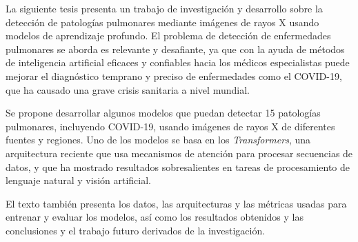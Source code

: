 

La siguiente tesis presenta un trabajo de investigación y desarrollo sobre la detección de patologías
pulmonares mediante imágenes de
rayos X usando modelos de aprendizaje profundo. El problema de detección de enfermedades pulmonares
se aborda es relevante y desafiante, ya que con la ayuda de métodos de inteligencia artificial
eficaces y confiables hacia los médicos especialistas puede mejorar el diagnóstico temprano y preciso
de enfermedades como el COVID-19, que ha causado una grave crisis sanitaria a nivel mundial.

Se propone desarrollar algunos modelos que puedan detectar 15 patologías pulmonares, incluyendo COVID-19,
usando imágenes de rayos X de diferentes fuentes y regiones. Uno de los modelos se basa en los
\textit{Transformers}, una arquitectura reciente que usa mecanismos de atención para procesar
secuencias de datos, y que ha mostrado resultados sobresalientes en tareas de procesamiento de
lenguaje natural y visión artificial.

El texto también presenta los datos, las arquitecturas y las métricas usadas para entrenar y evaluar
los modelos, así como los resultados obtenidos y las conclusiones y el trabajo futuro derivados
de la investigación.
